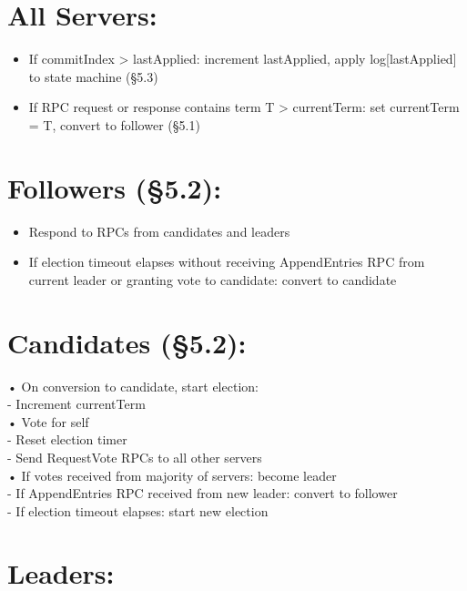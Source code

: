 \documentclass[
]{article}
\providecommand{\tightlist}{%
  \setlength{\itemsep}{0pt}\setlength{\parskip}{0pt}}
\begin{document}
\section{All Servers:}\label{all-servers}

\begin{itemize}
\tightlist
\item
  If commitIndex \textgreater{} lastApplied: increment lastApplied,
  apply log{[}lastApplied{]} to state machine (§5.3)\\
\item
  If RPC request or response contains term T \textgreater{} currentTerm:
  set currentTerm = T, convert to follower (§5.1)
\end{itemize}

\section{Followers (§5.2):}\label{followers-5.2}

\begin{itemize}
\tightlist
\item
  Respond to RPCs from candidates and leaders\\
\item
  If election timeout elapses without receiving AppendEntries RPC from
  current leader or granting vote to candidate: convert to candidate
\end{itemize}

\section{Candidates (§5.2):}\label{candidates-5.2}

• On conversion to candidate, start election:\\
- Increment currentTerm\\
• Vote for self\\
- Reset election timer\\
- Send RequestVote RPCs to all other servers\\
• If votes received from majority of servers: become leader\\
- If AppendEntries RPC received from new leader: convert to follower\\
- If election timeout elapses: start new election

\section{Leaders:}\label{leaders}
\end{document}
